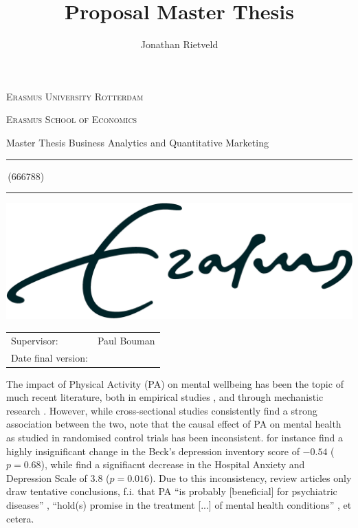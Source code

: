 \documentclass[a4paper,11pt]{report}
\author{Jonathan Rietveld}
\title{Proposal Master Thesis}
\newcommand{\studentnumber}{666788}
\newcommand{\program}{Business Analytics and Quantitative Marketing}
\newcommand{\supervisor}{Paul Bouman}
\begin{document}
\begin{titlepage}
\makeatletter
\begin{center}
	\textsc{Erasmus University Rotterdam}
	\par \textsc{Erasmus School of Economics}
	\par Master Thesis \program

	\vfill \hrule height .08em \bigskip
	\par\huge\@title\bigskip
	\par\Large\@author\,(\studentnumber)\bigskip
	\hrule height .08em\normalsize

	\vfill
	\includegraphics[width=\textwidth,height=0.15\textheight,keepaspectratio]{../eur}
	\vfill

	\begin{tabular}{ll}
		\toprule
		Supervisor: & \supervisor\\
		Date final version: & \@date\\
		\bottomrule
	\end{tabular}

	\vfill
\end{center}
\makeatother
\end{titlepage}

The impact of Physical Activity (PA) on mental wellbeing has been the topic of much recent literature,
both in empirical studies \cite{noetel2024effect, mahindru2023role}, and through mechanistic research \cite{smith2021role}.
However, while cross-sectional studies consistently find a strong association between the two, 
note that the causal effect of PA on mental health as studied in randomised control trials has been inconsistent.
 for instance find a highly insignificant change in the Beck's depression inventory score
of $-0.54$ ($p = 0.68$), while  find a signifiacnt decrease in the Hospital Anxiety and
Depression Scale of $3.8$ ($p = 0.016$).
Due to this inconsistency, review articles only draw tentative conclusions, f.i. that PA ``is probably [beneficial]
for psychiatric diseases'' \cite{peluso2005physical}, ``hold(s) promise in the treatment [...] of mental health conditions''
\cite{smith2021role}, et cetera.
\end{document}
